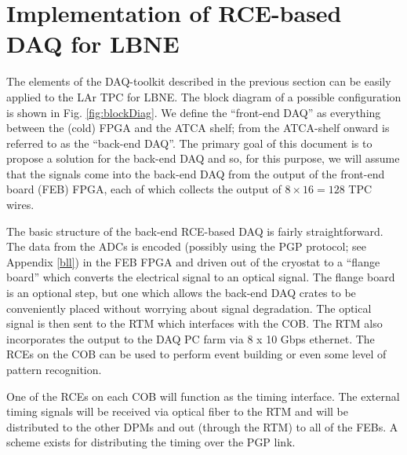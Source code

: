 \section{Implementation of RCE-based DAQ for LBNE}


The elements of the DAQ-toolkit described in the previous section can be easily applied to the LAr TPC for LBNE.  The block diagram of a possible configuration is shown in Fig. \ref{fig:blockDiag}.  We define the ``front-end DAQ'' as everything between the (cold) FPGA and the ATCA shelf; from the ATCA-shelf onward is referred to as the ``back-end DAQ''.    The primary goal of this document is to propose a solution for the back-end DAQ and so, for this purpose, we will assume that the signals come into the back-end DAQ from the output of the front-end board (FEB) FPGA, each of which collects the output of  $8\times 16 = 128$ TPC wires.  

The basic structure of the back-end RCE-based DAQ is fairly straightforward.  The data from the ADCs is encoded (possibly using the PGP protocol; see Appendix \ref{bll}) in the FEB FPGA and driven out of the cryostat to a ``flange board'' which converts the electrical signal to an optical signal.  The flange board is an optional step, but one which allows the back-end DAQ crates to be conveniently placed without worrying about signal degradation.   The optical signal is then sent to the RTM which interfaces with the COB.  The RTM also incorporates the output to the DAQ PC farm via 8 x 10 Gbps ethernet.  The RCEs on the COB can be used to perform event building or even some level of pattern recognition. 

One of the RCEs on each COB will function as the timing interface.  The  external timing  signals will be received via optical fiber to the RTM and will be distributed to the other DPMs and out (through the RTM) to all of the FEBs.  A scheme exists for distributing the timing over the PGP link.  




